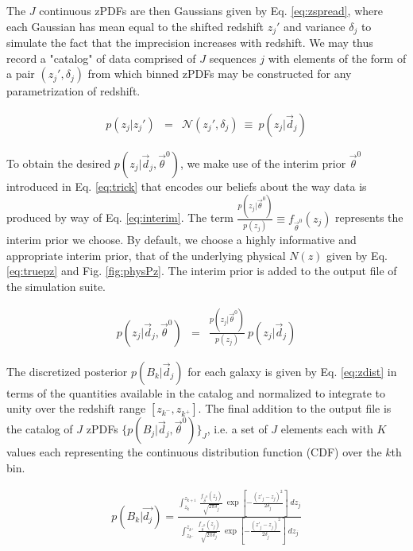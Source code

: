 \documentclass[preprint]{aastex}
\begin{document}
The $J$ continuous zPDFs are then Gaussians given by Eq. \ref{eq:zspread}, where each Gaussian has mean equal to the shifted redshift $z_{j}'$ and variance $\delta_{j}$ to simulate the fact that the imprecision increases with redshift.  We may thus record a "catalog" of data comprised of $J$ sequences $j$ with elements of the form of a pair $(z_{j}',\delta_{j})$ from which binned zPDFs may be constructed for any parametrization of redshift.  

\begin{eqnarray}
\label{eq:zspread}
p(z_{j}|z_{j}') &=& \mathcal{N}(z_{j}',\delta_{j})\ \equiv\ p(z_{j}|\vec{d}_{j})
\end{eqnarray}

To obtain the desired $p(z_{j}|\vec{d}_{j},\vec{\theta}^{0})$, we make use of the interim prior $\vec{\theta}^{0}$ introduced in Eq. \ref{eq:trick} that encodes our beliefs about the way data is produced by way of Eq. \ref{eq:interim}.  The term $\frac{p(z_{j}|\vec{\theta}^{0})}{p(z_{j})}\equiv f_{\vec{\theta}^{0}}(z_{j})$ represents the interim prior we choose.  By default, we choose a highly informative and appropriate interim prior, that of the underlying physical $N(z)$ given by Eq. \ref{eq:truepz} and Fig. \ref{fig:physPz}.  The interim prior is added to the output file of the simulation suite.  

\begin{eqnarray}
\label{eq:interim}
p(z_{j}|\vec{d}_{j},\vec{\theta}^{0}) &=& \frac{p(z_{j}|\vec{\theta}^{0})}{p(z_{j})}\ p(z_{j}|\vec{d}_{j})
\end{eqnarray}

The discretized posterior $p(B_{k}|\vec{d}_{j})$ for each galaxy is given by Eq. \ref{eq:zdist} in terms of the quantities available in the catalog and normalized to integrate to unity over the redshift range $[z_{k^{-}},z_{k^{+}}]$.  The final addition to the output file is the catalog of $J$ zPDFs $\{p(B_{j}|\vec{d}_{j},\vec{\theta}^{0})\}_{J}$, i.e. a set of $J$ elements each with $K$ values each representing the continuous distribution function (CDF) over the $k$th bin.

\begin{eqnarray}
\label{eq:zdist}
p(B_{k}|\vec{d_{j}}) = \frac{\int_{z_{k}}^{z_{k+1}}\ \frac{f_{\vec{\theta}^{0}}(z_{j})}{\sqrt{2\pi\delta_{j}}}\ \exp\left[-\frac{(z'_{j}-z_{j})^{2}}{2\delta_{j}}\right]\ dz_{j}}{\int_{z_{k^{-}}}^{z_{k^{+}}}\ \frac{f_{\vec{\theta}^{0}}(z_{j})}{\sqrt{2\pi\delta_{j}}}\ \exp\left[-\frac{(z'_{j}-z_{j})^{2}}{2\delta_{j}}\right]\ dz_{j}}
\end{eqnarray}
\end{document}

